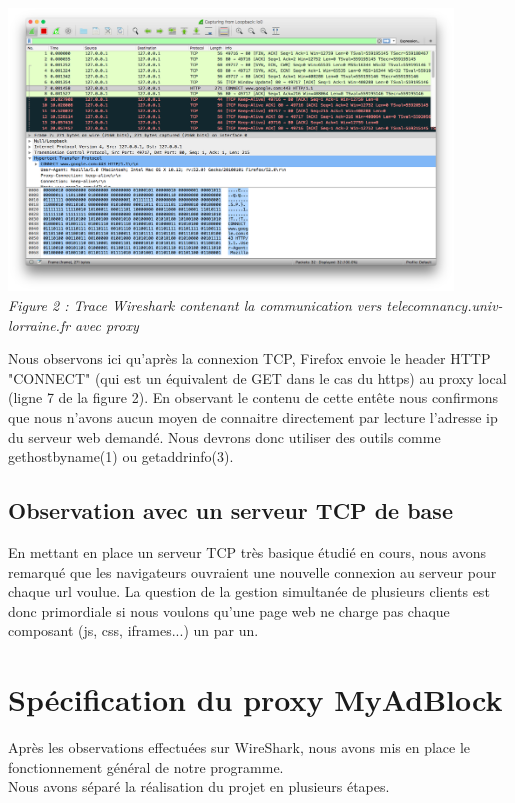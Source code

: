 \documentclass{scrreprt}
\begin{document}
\begin{center}
  \includegraphics[height=7.5cm]{images/f2.png}
  \\
  \textit{Figure 2 : Trace Wireshark contenant la communication vers telecomnancy.univ-lorraine.fr avec proxy}
\end{center}

Nous observons ici qu'après la connexion TCP, Firefox envoie le header HTTP "CONNECT" (qui est un équivalent de GET dans le cas du https) au proxy local (ligne 7 de la figure 2). En observant le contenu de cette entête nous confirmons que nous n'avons aucun moyen de connaitre directement par lecture l'adresse ip du serveur web demandé. Nous devrons donc utiliser des outils comme gethostbyname(1) ou getaddrinfo(3).

\subsection{Observation avec un serveur TCP de base}
En mettant en place un serveur TCP très basique étudié en cours, nous avons remarqué que les navigateurs ouvraient une nouvelle connexion au serveur pour chaque url voulue. La question de la gestion simultanée de plusieurs clients est donc primordiale si nous voulons qu'une page web ne charge pas chaque composant (js, css, iframes...) un par un.

\section{Spécification du proxy MyAdBlock}
Après les observations effectuées sur WireShark, nous avons mis en place le fonctionnement général de notre programme.\\
Nous avons séparé la réalisation du projet en plusieurs étapes.
\end{document}
